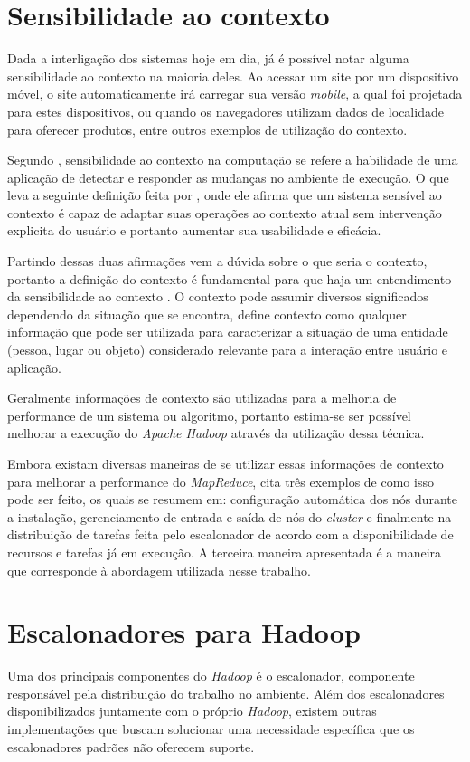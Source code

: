 \section{Sensibilidade ao contexto}
Dada a interligação dos sistemas hoje em dia, já é possível notar alguma sensibilidade ao contexto na maioria deles. Ao acessar um site por um dispositivo móvel, o site automaticamente irá carregar sua versão \emph{mobile}, a qual foi projetada para estes dispositivos, ou quando os navegadores utilizam dados de localidade para oferecer produtos, entre outros exemplos de utilização do contexto.

Segundo \cite{Zakaria}, sensibilidade ao contexto na computação se refere a habilidade de uma aplicação de detectar e responder as mudanças no ambiente de execução. O que leva a seguinte definição feita por \cite{Baldauf}, onde ele afirma que um sistema sensível ao contexto é capaz de adaptar suas operações ao contexto atual sem intervenção explicita do usuário e portanto aumentar sua usabilidade e eficácia.

Partindo dessas duas afirmações vem a dúvida sobre o que seria o contexto, portanto a definição do contexto é fundamental para que haja um entendimento da sensibilidade ao contexto \cite{Manuele}. O contexto pode assumir diversos significados dependendo da situação que se encontra, \cite{Dey} define contexto como qualquer informação que pode ser utilizada para caracterizar a situação de uma entidade (pessoa, lugar ou objeto) considerado relevante para a interação entre usuário e aplicação.

Geralmente informações de contexto são utilizadas para a melhoria de performance de um sistema ou algoritmo, portanto estima-se ser possível melhorar a execução do \emph{Apache Hadoop} através da utilização dessa técnica. 

Embora existam diversas maneiras de se utilizar essas informações de contexto para melhorar a performance do \emph{MapReduce}, \cite{Manuele} cita três exemplos de como isso pode ser feito, os quais se resumem em: configuração automática dos nós durante a instalação, gerenciamento de entrada e saída de nós do \emph{cluster} e finalmente na distribuição de tarefas feita pelo escalonador de acordo com a disponibilidade de recursos e tarefas já em execução. A terceira maneira apresentada é a maneira que corresponde à abordagem utilizada nesse trabalho.

\section{Escalonadores para Hadoop}
Uma dos principais componentes do \emph{Hadoop} é o escalonador, componente responsável pela distribuição do trabalho no ambiente. Além dos escalonadores disponibilizados juntamente com o próprio \emph{Hadoop}, existem outras implementações que buscam solucionar uma necessidade específica que os escalonadores padrões não oferecem suporte.


